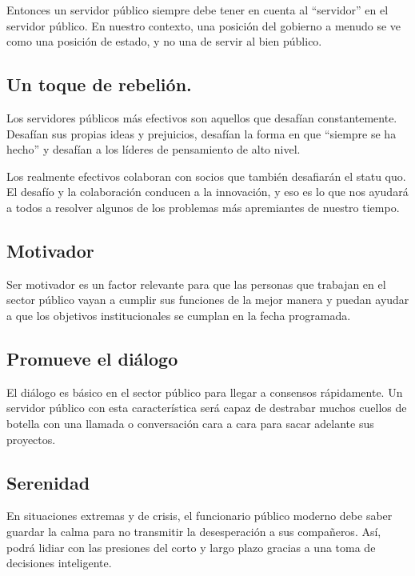 \documentclass[
  jou,
  floatsintext,
  longtable,
  a4paper,
  nolmodern,
  notxfonts,
  notimes,
  12pt,
  colorlinks=true,linkcolor=blue,citecolor=blue,urlcolor=blue]{apa7}
\begin{document}
Entonces un servidor público siempre debe tener en cuenta al
``servidor'' en el servidor público. En nuestro contexto, una posición
del gobierno a menudo se ve como una posición de estado, y no una de
servir al bien público.

\subsection{Un toque de rebelión.}\label{un-toque-de-rebeliuxf3n.}

Los servidores públicos más efectivos son aquellos que desafían
constantemente. Desafían sus propias ideas y prejuicios, desafían la
forma en que ``siempre se ha hecho'' y desafían a los líderes de
pensamiento de alto nivel.

Los realmente efectivos colaboran con socios que también desafiarán el
statu quo. El desafío y la colaboración conducen a la innovación, y eso
es lo que nos ayudará a todos a resolver algunos de los problemas más
apremiantes de nuestro tiempo.

\subsection{Motivador}\label{motivador}

Ser motivador es un factor relevante para que las personas que trabajan
en el sector público vayan a cumplir sus funciones de la mejor manera y
puedan ayudar a que los objetivos institucionales se cumplan en la fecha
programada.

\subsection{Promueve el diálogo}\label{promueve-el-diuxe1logo}

El diálogo es básico en el sector público para llegar a consensos
rápidamente. Un servidor público con esta característica será capaz de
destrabar muchos cuellos de botella con una llamada o conversación cara
a cara para sacar adelante sus proyectos.

\subsection{Serenidad}\label{serenidad}

En situaciones extremas y de crisis, el funcionario público moderno debe
saber guardar la calma para no transmitir la desesperación a sus
compañeros. Así, podrá lidiar con las presiones del corto y largo plazo
gracias a una toma de decisiones inteligente.
\end{document}
